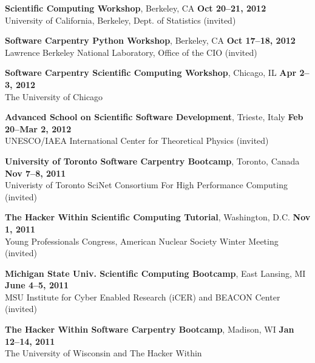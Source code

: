\documentclass[margin,line]{resume}
\begin{document}
\begin{resume}
    \textbf{Scientific Computing Workshop}, Berkeley, CA \hfill \textbf{Oct 20--21, 2012}\\
               University of California, Berkeley, Dept. of Statistics (invited)

    \textbf{Software Carpentry Python Workshop}, Berkeley, CA \hfill \textbf{Oct 17--18, 2012}\\
               Lawrence Berkeley National Laboratory, Office of the CIO (invited)

    \textbf{Software Carpentry Scientific Computing Workshop}, Chicago, IL \hfill \textbf{Apr 2--3, 2012}\\
               The University of Chicago 

    \textbf{Advanced School on Scientific Software Development}, Trieste, Italy \hfill \textbf{Feb 20--Mar 2, 2012}\\
               UNESCO/IAEA International Center for Theoretical Physics (invited)

    \textbf{University of Toronto Software Carpentry Bootcamp}, Toronto, Canada \hfill \textbf{Nov 7--8, 2011}\\
               Univeristy of Toronto SciNet Consortium For High Performance Computing (invited)

    \textbf{The Hacker Within Scientific Computing Tutorial}, Washington, D.C.  \hfill \textbf{Nov 1, 2011}\\
               Young Professionals Congress, American Nuclear Society Winter Meeting (invited)

    \textbf{Michigan State Univ. Scientific Computing Bootcamp}, East Lansing, MI \hfill \textbf{June 4--5, 2011}\\
               MSU Institute for Cyber Enabled Research (iCER) and BEACON Center (invited)

    \textbf{The Hacker Within Software Carpentry Bootcamp}, Madison, WI \hfill\textbf{Jan 12--14, 2011}\\
               The University of Wisconsin and The Hacker Within


\end{resume}
\end{document}
